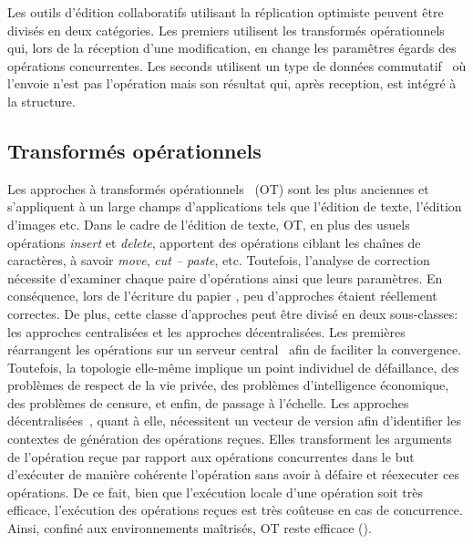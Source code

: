 Les outils d'édition collaboratifs utilisant la réplication optimiste peuvent
être divisés en deux catégories. Les premiers utilisent les transformés
opérationnels~\cite{sun2009contextbased, sun1998operational} qui, lors de la
réception d'une modification, en change les paramêtres égards des opérations
concurrentes. Les seconds utilisent un type de données
commutatif~\cite{shapiro2011comprehensive, shapiro2011conflict} où l'envoie
n'est pas l'opération mais son résultat qui, après reception, est intégré à la
structure. 

\subsection{Transformés opérationnels}

Les approches à transformés opérationnels~\cite{sun2009contextbased,
  sun1998operational} (OT) sont les plus anciennes et s'appliquent à un large
champs d'applications tels que l'édition de texte, l'édition d'images etc. Dans
le cadre de l'édition de texte, OT, en plus des usuels opérations \emph{insert}
et \emph{delete}, apportent des opérations ciblant les chaînes de caractères, à
savoir \emph{move}, \emph{cut -- paste}, etc. Toutefois, l'analyse de correction
nécessite d'examiner chaque paire d'opérations ainsi que leurs paramètres. En
conséquence, lors de l'écriture du papier \cite{imine2003proving}, peu
d'approches étaient réellement correctes. De plus, cette classe d'approches peut
être divisé en deux sous-classes: les approches centralisées et les approches
décentralisées. Les premières réarrangent les opérations sur un serveur
central~\cite{nichols1995high} afin de faciliter la convergence. Toutefois, la
topologie elle-même implique un point individuel de défaillance, des problèmes
de respect de la vie privée, des problèmes d'intelligence économique, des
problèmes de censure, et enfin, de passage à l'échelle. Les approches
décentralisées~\cite{sun2009contextbased}, quant à elle, nécessitent un vecteur
de version afin d'identifier les contextes de génération des opérations
reçues. Elles transforment les arguments de l'opération reçue par rapport aux
opérations concurrentes dans le but d'exécuter de manière cohérente l'opération
sans avoir à défaire et réexecuter ces opérations. De ce fait, bien que
l'exécution locale d'une opération soit très efficace, l'exécution des
opérations reçues est très coûteuse en cas de concurrence. Ainsi, confiné aux
environnements maîtrisés, OT reste efficace ().

